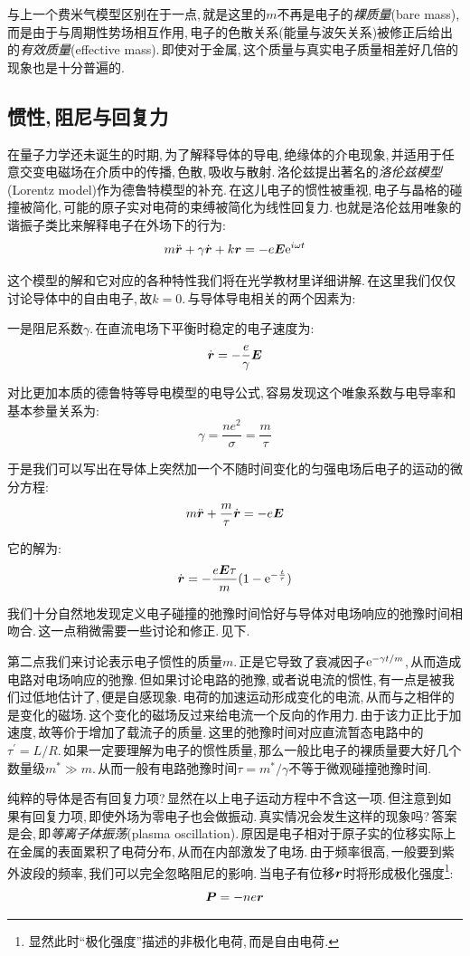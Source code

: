 与上一个费米气模型区别在于一点,\,就是这里的$m$不再是电子的\emph{裸质量}(bare mass),\,而是由于与周期性势场相互作用,\,电子的色散关系(能量与波矢关系)被修正后给出的\emph{有效质量}(effective mass).\,即使对于金属,\,这个质量与真实电子质量相差好几倍的现象也是十分普遍的.



\subsection{惯性,\,阻尼与回复力}

在量子力学还未诞生的时期,\,为了解释导体的导电,\,绝缘体的介电现象,\,并适用于任意交变电磁场在介质中的传播,\,色散,\,吸收与散射.\,洛伦兹提出著名的\emph{洛伦兹模型}(Lorentz model)作为德鲁特模型的补充.\,在这儿电子的惯性被重视,\,电子与晶格的碰撞被简化,\,可能的原子实对电荷的束缚被简化为线性回复力.\,也就是洛伦兹用唯象的谐振子类比来解释电子在外场下的行为:
\[m\ddot{\boldsymbol{r}}+\gamma \dot{\boldsymbol{r}}+ k\boldsymbol{r}=-e\boldsymbol{E}{\rm e}^{i\omega t}\]

这个模型的解和它对应的各种特性我们将在光学教材里详细讲解.\,在这里我们仅仅讨论导体中的自由电子,\,故$k=0$.\,与导体导电相关的两个因素为:

一是阻尼系数$\gamma$.\,在直流电场下平衡时稳定的电子速度为:
\[\dot{\boldsymbol{r}}=-\frac{e}{\gamma}\boldsymbol{E}\]

对比更加本质的德鲁特等导电模型的电导公式,\,容易发现这个唯象系数与电导率和基本参量关系为:
\[\gamma=\frac{ne^2}{\sigma}=\frac{m}{\tau}\]

于是我们可以写出在导体上突然加一个不随时间变化的匀强电场后电子的运动的微分方程:
\[m\ddot{\boldsymbol{r}}+\frac{m}{\tau} \dot{\boldsymbol{r}}=-e\boldsymbol{E}\]

它的解为:
\[\dot{\boldsymbol{r}}=-\frac{e\boldsymbol{E}\tau}{m}(1-{\rm e}^{-\frac{t}{\tau}})\]

我们十分自然地发现定义电子碰撞的弛豫时间恰好与导体对电场响应的弛豫时间相吻合.\,这一点稍微需要一些讨论和修正.\,见下.

第二点我们来讨论表示电子惯性的质量$m$.\,正是它导致了衰减因子${\rm e}^{-\gamma t/m}$,\,从而造成电路对电场响应的弛豫.\,但如果讨论电路的弛豫,\,或者说电流的惯性,\,有一点是被我们过低地估计了,\,便是自感现象.\,电荷的加速运动形成变化的电流,\,从而与之相伴的是变化的磁场.\,这个变化的磁场反过来给电流一个反向的作用力.\,由于该力正比于加速度,\,故等价于增加了载流子的质量.\,这里的弛豫时间对应直流暂态电路中的$\tau^\prime=L/R$.\,如果一定要理解为电子的惯性质量,\,那么一般比电子的裸质量要大好几个数量级$m^\ast\gg m$.\,从而一般有电路弛豫时间$\tau=m^\ast/\gamma$不等于微观碰撞弛豫时间.

纯粹的导体是否有回复力项?\,显然在以上电子运动方程中不含这一项.\,但注意到如果有回复力项,\,即使外场为零电子也会做振动.\,真实情况会发生这样的现象吗?\,答案是会,\,即\emph{等离子体振荡}(plasma oscillation).\,原因是电子相对于原子实的位移实际上在金属的表面累积了电荷分布,\,从而在内部激发了电场.\,由于频率很高,\,一般要到紫外波段的频率,\,我们可以完全忽略阻尼的影响.\,当电子有位移$\boldsymbol{r}$时将形成极化强度\footnote{显然此时``极化强度''描述的非极化电荷,\,而是自由电荷.}:
\[\boldsymbol{P}=-ne\boldsymbol{r}\]

